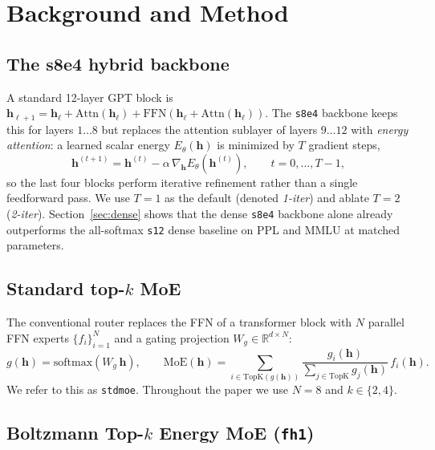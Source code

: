 \documentclass[oneside]{article}
\begin{document}
\section{Background and Method}

\subsection{The s8e4 hybrid backbone}
\label{sec:s8e4}

A standard 12-layer GPT block is $\mathbf{h}_{\ell+1} = \mathbf{h}_\ell + \mathrm{Attn}(\mathbf{h}_\ell) + \mathrm{FFN}(\mathbf{h}_\ell + \mathrm{Attn}(\mathbf{h}_\ell))$. The \texttt{s8e4} backbone keeps this for layers $1\ldots 8$ but replaces the attention sublayer of layers $9\ldots 12$ with \emph{energy attention}: a learned scalar energy $E_\theta(\mathbf{h})$ is minimized by $T$ gradient steps,
\begin{equation}
  \mathbf{h}^{(t+1)} = \mathbf{h}^{(t)} - \alpha\, \nabla_{\mathbf{h}} E_\theta(\mathbf{h}^{(t)}),\qquad t=0,\ldots,T-1,
\end{equation}
so the last four blocks perform iterative refinement rather than a single feedforward pass. We use $T=1$ as the default (denoted \emph{1-iter}) and ablate $T=2$ (\emph{2-iter}). Section~\ref{sec:dense} shows that the dense \texttt{s8e4} backbone alone already outperforms the all-softmax \texttt{s12} dense baseline on PPL and MMLU at matched parameters.

\subsection{Standard top-$k$ MoE}

The conventional router replaces the FFN of a transformer block with $N$ parallel FFN experts $\{f_i\}_{i=1}^N$ and a gating projection $W_g\in\mathbb{R}^{d\times N}$:
\begin{equation}
  g(\mathbf{h}) = \mathrm{softmax}(W_g\, \mathbf{h}),\qquad
  \mathrm{MoE}(\mathbf{h}) = \sum_{i\in \mathrm{TopK}(g(\mathbf{h}))} \frac{g_i(\mathbf{h})}{\sum_{j\in \mathrm{TopK}} g_j(\mathbf{h})}\, f_i(\mathbf{h}).
\end{equation}
We refer to this as \texttt{stdmoe}. Throughout the paper we use $N=8$ and $k\in\{2,4\}$.

\subsection{Boltzmann Top-$k$ Energy MoE (\texttt{fh1})}
\end{document}
